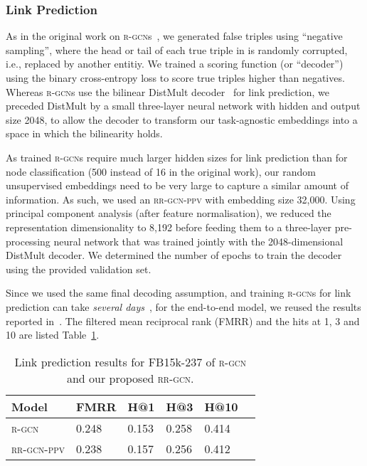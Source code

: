\documentclass{llncs}
\begin{document}
\subsubsection{Link Prediction}
As in the original work on \textsc{r-gcn}s~\cite{schlichtkrull2018modeling}, we generated false triples using ``negative sampling'', where the head or tail of each true triple in  is randomly corrupted, i.e., replaced by another entitiy. We trained a scoring function (or ``decoder'') using the binary cross-entropy loss to score true triples higher than negatives. Whereas \textsc{r-gcn}s use the bilinear DistMult decoder~\cite{schlichtkrull2018modeling,yang2015embedding} for link prediction, we preceded DistMult by a small three-layer neural network with hidden and output size 2048, to allow the decoder to transform our task-agnostic embeddings into a space in which the bilinearity holds. 

As trained \textsc{r-gcn}s require much larger hidden sizes for link prediction than for node classification (500 instead of 16 in the original work), our random unsupervised embeddings need to be very large to capture a similar amount of information. As such, we used an \textsc{rr-gcn-ppv} with embedding size 32,000. Using principal component analysis (after feature normalisation), we reduced the representation dimensionality to 8,192 before feeding them to a three-layer pre-processing neural network that was trained jointly with the 2048-dimensional DistMult decoder. We determined the number of epochs to train the decoder using the provided validation set.

Since we used the same final decoding assumption, and training \textsc{r-gcn}s for link prediction can take \textit{several days}~\cite{thanapalasingam2021relational}, for the end-to-end model, we reused the results reported in~\cite{schlichtkrull2018modeling}. The filtered mean reciprocal rank (FMRR) and the hits at 1, 3 and 10 are listed Table~\ref{tab:linkpred}. 

\begin{table}[t]
\begin{center}
\begin{tabular}{llllll}\toprule
 \textbf{Model}      &  \textbf{FMRR} &  \textbf{H@1} &  \textbf{H@3} & \textbf{H@10}\\\midrule
\textsc{r-gcn} &  0.248 & 0.153 & 0.258 & 0.414\\
\textsc{rr-gcn-ppv} & 0.238 & 0.157 & 0.256 & 0.412  \\\bottomrule
\end{tabular}
\end{center}
\caption{Link prediction results for FB15k-237 of \textsc{r-gcn} and our proposed \textsc{rr-gcn}.\label{tab:linkpred}}
\end{table}
\end{document}
